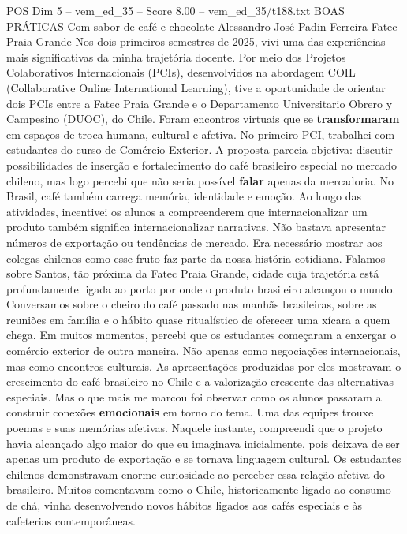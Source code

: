 \begin{textsample}{POS Dim 5 – vem\_ed\_35 – Score 8.00 – vem\_ed\_35/t188.txt}  \label{ex:f5_pos_009}
BOAS PRÁTICAS Com sabor de café e chocolate Alessandro José Padin Ferreira Fatec Praia Grande Nos dois primeiros semestres de 2025, vivi uma das experiências mais significativas da minha trajetória docente.
Por meio dos Projetos Colaborativos Internacionais (PCIs), desenvolvidos na abordagem COIL (Collaborative Online International Learning), tive a oportunidade de orientar dois PCIs entre a Fatec Praia Grande e o Departamento Universitario Obrero y Campesino (DUOC), do Chile.
Foram encontros virtuais que se \textbf{transformaram} em espaços de troca humana, cultural e afetiva.
No primeiro PCI, trabalhei com estudantes do curso de Comércio Exterior.
A proposta parecia objetiva: discutir possibilidades de inserção e fortalecimento do café brasileiro especial no mercado chileno, mas logo percebi que não seria possível \textbf{falar} apenas da mercadoria.
No Brasil, café também carrega memória, identidade e emoção.
Ao longo das atividades, incentivei os alunos a compreenderem que internacionalizar um produto também significa internacionalizar narrativas.
Não bastava apresentar números de exportação ou tendências de mercado.
Era necessário mostrar aos colegas chilenos como esse fruto faz parte da nossa história cotidiana.
Falamos sobre Santos, tão próxima da Fatec Praia Grande, cidade cuja trajetória está profundamente ligada ao porto por onde o produto brasileiro alcançou o mundo.
Conversamos sobre o cheiro do café passado nas manhãs brasileiras, sobre as reuniões em família e o hábito quase ritualístico de oferecer uma xícara a quem chega.
Em muitos momentos, percebi que os estudantes começaram a enxergar o comércio exterior de outra maneira.
Não apenas como negociações internacionais, mas como encontros culturais.
As apresentações produzidas por eles mostravam o crescimento do café brasileiro no Chile e a valorização crescente das alternativas especiais.
Mas o que mais me marcou foi observar como os alunos passaram a construir conexões \textbf{emocionais} em torno do tema.
Uma das equipes trouxe poemas e suas memórias afetivas.
Naquele instante, compreendi que o projeto havia alcançado algo maior do que eu imaginava inicialmente, pois deixava de ser apenas um produto de exportação e se tornava linguagem cultural.
Os estudantes chilenos demonstravam enorme curiosidade ao perceber essa relação afetiva do brasileiro.
Muitos comentavam como o Chile, historicamente ligado ao consumo de chá, vinha desenvolvendo novos hábitos ligados aos cafés especiais e às cafeterias contemporâneas.

\end{textsample}
